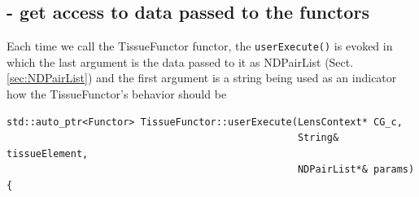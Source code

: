 \subsection{- get access to data passed to the functors}
\label{sec:TissueFunctor-get-access-to-passed-data}

Each time we call the TissueFunctor functor, the \verb!userExecute()! is evoked
in which the last argument is the data passed to it as NDPairList
(Sect.\ref{sec:NDPairList}) and the first argument is a string being used as an
indicator how the TissueFunctor's behavior should be
\begin{verbatim}
std::auto_ptr<Functor> TissueFunctor::userExecute(LensContext* CG_c,
                                                  String& tissueElement,
                                                  NDPairList*& params) {

\end{verbatim}

